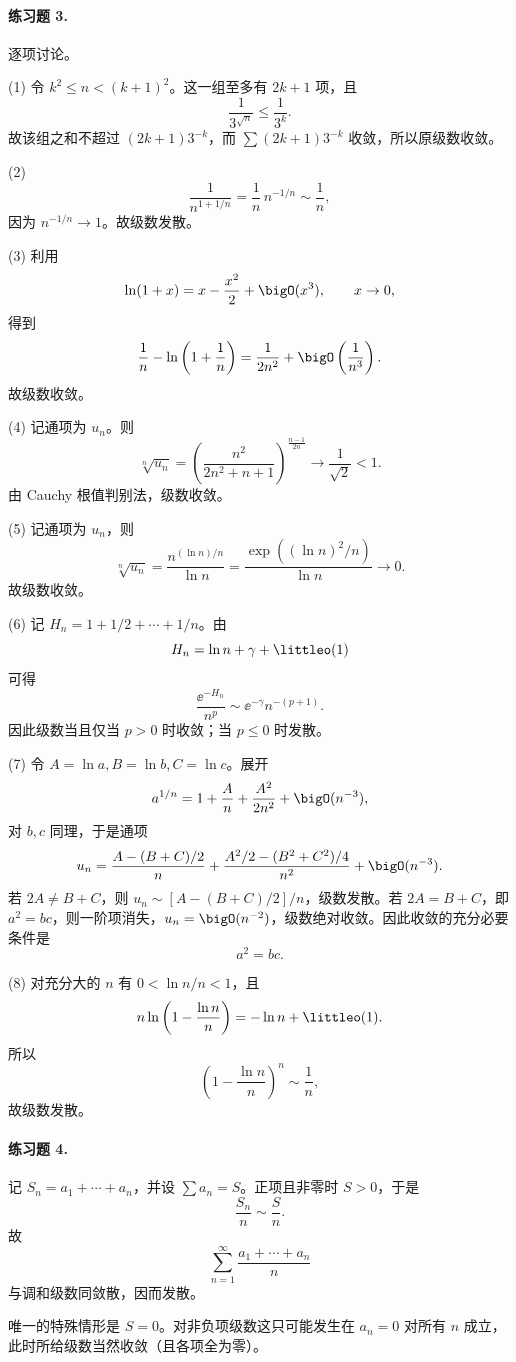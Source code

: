 \paragraph{练习题 3.}
\begin{xsolution}
逐项讨论。

(1) 令 $k^2\leq n<(k+1)^2$。这一组至多有 $2k+1$ 项，且
\[
 \frac1{3^{\sqrt n}}\leq\frac1{3^k}.
\]
故该组之和不超过 $(2k+1)3^{-k}$，而 $\sum(2k+1)3^{-k}$ 收敛，所以原级数收敛。

(2)
\[
 \frac1{n^{1+1/n}}=\frac1n\,n^{-1/n}\sim\frac1n,
\]
因为 $n^{-1/n}\to1$。故级数发散。

(3) 利用
\[
 \ln(1+x)=x-\frac{x^2}{2}+\bigO(x^3),\qquad x\to0,
\]
得到
\[
 \frac1n-\ln\left(1+\frac1n\right)
 =\frac1{2n^2}+\bigO\left(\frac1{n^3}\right).
\]
故级数收敛。

(4) 记通项为 $u_n$。则
\[
 \sqrt[n]{u_n}
 =\left(\frac{n^2}{2n^2+n+1}\right)^{\frac{n-1}{2n}}
 \longrightarrow\frac1{\sqrt2}<1.
\]
由 Cauchy 根值判别法，级数收敛。

(5) 记通项为 $u_n$，则
\[
 \sqrt[n]{u_n}
 =\frac{n^{(\ln n)/n}}{\ln n}
 =\frac{\exp((\ln n)^2/n)}{\ln n}\longrightarrow0.
\]
故级数收敛。

(6) 记 $H_n=1+1/2+\cdots+1/n$。由
\[
 H_n=\ln n+\gamma+\littleo(1)
\]
可得
\[
 \frac{\ee^{-H_n}}{n^p}
 \sim \ee^{-\gamma}n^{-(p+1)}.
\]
因此级数当且仅当 $p>0$ 时收敛；当 $p\leq0$ 时发散。

(7) 令 $A=\ln a,B=\ln b,C=\ln c$。展开
\[
 a^{1/n}=1+\frac A n+\frac{A^2}{2n^2}+\bigO(n^{-3}),
\]
对 $b,c$ 同理，于是通项
\[
 u_n=\frac{A-(B+C)/2}{n}
 +\frac{A^2/2-(B^2+C^2)/4}{n^2}
 +\bigO(n^{-3}).
\]
若 $2A\neq B+C$，则 $u_n\sim[A-(B+C)/2]/n$，级数发散。若 $2A=B+C$，即 $a^2=bc$，则一阶项消失，$u_n=\bigO(n^{-2})$，级数绝对收敛。因此收敛的充分必要条件是
\[
 a^2=bc.
\]

(8) 对充分大的 $n$ 有 $0<\ln n/n<1$，且
\[
 n\ln\left(1-\frac{\ln n}{n}\right)
 =-\ln n+\littleo(1).
\]
所以
\[
 \left(1-\frac{\ln n}{n}\right)^n\sim\frac1n,
\]
故级数发散。
\end{xsolution}

\paragraph{练习题 4.}
\begin{xsolution}
记 $S_n=a_1+\cdots+a_n$，并设 $\sum a_n=S$。正项且非零时 $S>0$，于是
\[
 \frac{S_n}{n}\sim\frac S n.
\]
故
\[
 \sum_{n=1}^{\infty}\frac{a_1+\cdots+a_n}{n}
\]
与调和级数同敛散，因而发散。

唯一的特殊情形是 $S=0$。对非负项级数这只可能发生在 $a_n=0$ 对所有 $n$ 成立，此时所给级数当然收敛（且各项全为零）。
\end{xsolution}

